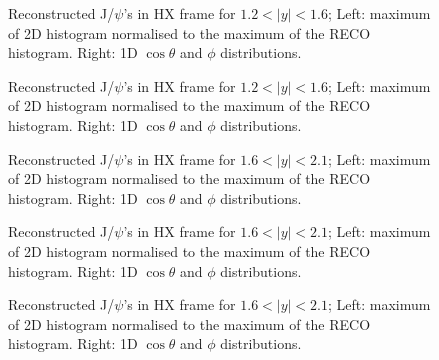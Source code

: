 \documentclass[12pt]{article}
\newcommand{\jpsi}{J/$\psi$}
\begin{document}
\begin{figure}[htbp]
\centering
{}
\caption{Reconstructed \jpsi's in HX frame for $1.2 < |y| < 1.6$; Left: maximum of 2D histogram normalised to the maximum of the RECO histogram. Right: 1D $\cos\theta$ and $\phi$ distributions.}
\label{fig:trackerMuonsVsEta}
\end{figure} \clearpage 

\begin{figure}[htbp]
\centering
{}
\caption{Reconstructed \jpsi's in HX frame for $1.2 < |y| < 1.6$; Left: maximum of 2D histogram normalised to the maximum of the RECO histogram. Right: 1D $\cos\theta$ and $\phi$ distributions.}
\label{fig:trackerMuonsVsEta}
\end{figure} \clearpage 

\begin{figure}[htbp]
\centering
{}
\caption{Reconstructed \jpsi's in HX frame for $1.6 < |y| < 2.1$; Left: maximum of 2D histogram normalised to the maximum of the RECO histogram. Right: 1D $\cos\theta$ and $\phi$ distributions.}
\label{fig:trackerMuonsVsEta}
\end{figure} \clearpage 

\begin{figure}[htbp]
\centering
{}
\caption{Reconstructed \jpsi's in HX frame for $1.6 < |y| < 2.1$; Left: maximum of 2D histogram normalised to the maximum of the RECO histogram. Right: 1D $\cos\theta$ and $\phi$ distributions.}
\label{fig:trackerMuonsVsEta}
\end{figure} \clearpage 

\begin{figure}[htbp]
\centering
{}
\caption{Reconstructed \jpsi's in HX frame for $1.6 < |y| < 2.1$; Left: maximum of 2D histogram normalised to the maximum of the RECO histogram. Right: 1D $\cos\theta$ and $\phi$ distributions.}
\label{fig:trackerMuonsVsEta}
\end{figure} \clearpage 
\end{document}
